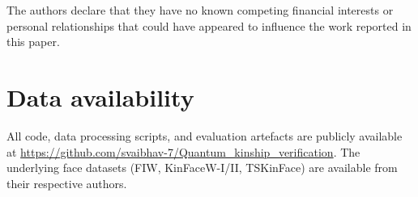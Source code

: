 \documentclass[preprint,12pt]{elsarticle}
\begin{document}
The authors declare that they have no known competing financial interests or
personal relationships that could have appeared to influence the work
reported in this paper.

\section*{Data availability}

All code, data processing scripts, and evaluation artefacts are publicly
available at \url{https://github.com/svaibhav-7/Quantum_kinship_verification}.
The underlying face datasets (FIW, KinFaceW-I/II, TSKinFace) are available
from their respective authors.

\end{document}
